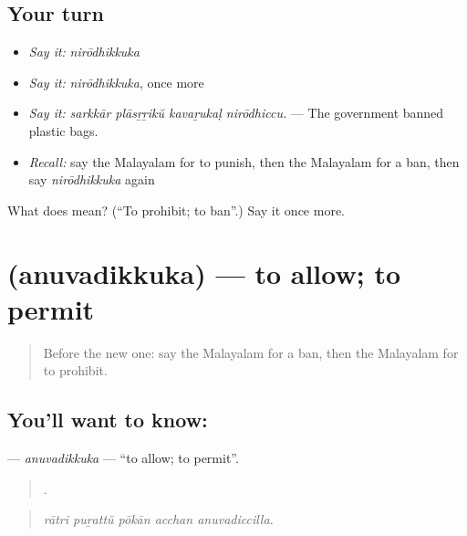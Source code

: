 \subsection*{Your turn}
\begin{itemize}
\raggedright
  \item \emph{Say it:} \emph{nirōdhikkuka}
  \item \emph{Say it:} \emph{nirōdhikkuka}, once more
  \item \emph{Say it:} \emph{sarkkār plāsṟṟikŭ kavaṟukaḷ nirōdhiccu.} — The government banned plastic bags.
  \item \emph{Recall:} say the Malayalam for to punish, then the Malayalam for a ban, then say \emph{nirōdhikkuka} again
\end{itemize}

\begin{tcolorbox}[breakable,colback=teal!4,colframe=teal!35!black,title={Before you move on}]
What does  mean? (\textquotedblleft{}To prohibit; to ban\textquotedblright{}.) Say it once more.
\end{tcolorbox}
\section[\texorpdfstring{\ml{അനുവദിക്കുക} (anuvadikkuka)}{അനുവദിക്കുക (anuvadikkuka)}]{ (anuvadikkuka) — to allow; to permit}

\label{lesson:ML-C418-anuvadikkuka}



\begin{quote}
Before the new one: say the Malayalam for a ban, then the Malayalam for to prohibit.
\end{quote}

\subsection*{You'll want to know: }
\textbf{} — \emph{anuvadikkuka} — \textquotedblleft{}to allow; to permit\textquotedblright{}.

\begin{quote}
    .
\end{quote}

\begin{quote}
\emph{rātri puṟattŭ pōkān acchan anuvadiccilla.}
\end{quote}

